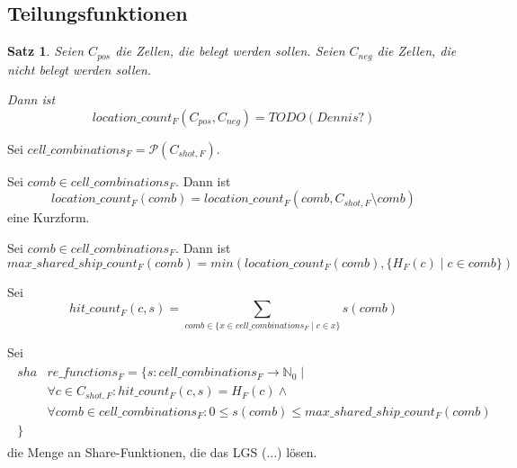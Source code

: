 \documentclass[a4paper,12pt]{llncs}
\newcommand{\N}{{\mathbb{N}}}
\numberwithin{equation}{section}
\newtheorem{satz}{Satz}
\begin{document}
\subsection{Teilungsfunktionen}

\begin{satz}
Seien $C_{pos}$ die Zellen, die belegt werden sollen. Seien $C_{neg}$ die Zellen, die nicht belegt werden sollen.

Dann ist
\[
location\_count_F(C_{pos}, C_{neg})=TODO (Dennis?)
\]
\end{satz}

\begin{definition}
Sei $cell\_combinations_F=\mathcal{P}(C_{shot,F})$.
\end{definition}

\begin{definition}
Sei $comb \in cell\_combinations_F$. Dann ist
\[
location\_count_F(comb)=location\_count_F(comb, C_{shot,F} \setminus comb)
\]
eine Kurzform.
\end{definition}

\begin{definition}
Sei $comb \in cell\_combinations_F$. Dann ist
\[
max\_shared\_ship\_count_F(comb)=min(location\_count_F(comb), \{H_F(c) \mid c \in comb\})
\]
\end{definition}

\begin{definition}
Sei
\[
hit\_count_F(c, s)=\sum_{comb \in \{x \in cell\_combinations_F \mid c \in x\}}{s(comb)}
\]
\end{definition}

\begin{definition}
Sei
\begin{align}
\begin{split}
sha&re\_functions_F=\{s \colon cell\_combinations_F \rightarrow \N_0 \mid\\
&\forall{c \in C_{shot,F}}\colon hit\_count_F(c, s)=H_F(c) \wedge \\
&\forall{comb \in cell\_combinations_F} \colon 0 \leq s(comb) \leq max\_shared\_ship\_count_F(comb)\\
\}\;\;\;& \nonumber
\end{split}
\end{align}
die Menge an Share-Funktionen, die das LGS (...) lösen.
\end{definition}
\end{document}
